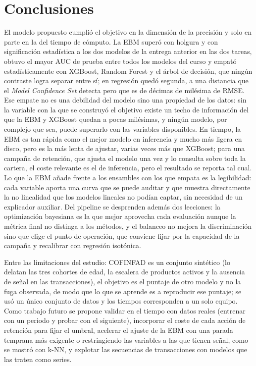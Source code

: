 \documentclass[pdflatex,sn-mathphys-num]{sn-jnl}
\begin{document}
\section{Conclusiones}\label{sec:conclusiones}

El modelo propuesto cumplió el objetivo en la dimensión de la precisión y solo en parte en la del tiempo de cómputo. La EBM superó con holgura y con significación estadística a los dos modelos de la entrega anterior en las dos tareas, obtuvo el mayor AUC de prueba entre todos los modelos del curso y empató estadísticamente con XGBoost, Random Forest y el árbol de decisión, que ningún contraste logra separar entre sí; en regresión quedó segunda, a una distancia que el \textit{Model Confidence Set} detecta pero que es de décimas de milésima de RMSE. Ese empate no es una debilidad del modelo sino una propiedad de los datos: sin la variable con la que se construyó el objetivo existe un techo de información del que la EBM y XGBoost quedan a pocas milésimas, y ningún modelo, por complejo que sea, puede superarlo con las variables disponibles. En tiempo, la EBM es tan rápida como el mejor modelo en inferencia y mucho más ligera en disco, pero es la más lenta de ajustar, varias veces más que XGBoost; para una campaña de retención, que ajusta el modelo una vez y lo consulta sobre toda la cartera, el coste relevante es el de inferencia, pero el resultado se reporta tal cual. Lo que la EBM añade frente a los ensambles con los que empata es la legibilidad: cada variable aporta una curva que se puede auditar y que muestra directamente la no linealidad que los modelos lineales no podían captar, sin necesidad de un explicador auxiliar. Del pipeline se desprenden además dos lecciones: la optimización bayesiana es la que mejor aprovecha cada evaluación aunque la métrica final no distinga a los métodos, y el balanceo no mejora la discriminación sino que elige el punto de operación, que conviene fijar por la capacidad de la campaña y recalibrar con regresión isotónica.

Entre las limitaciones del estudio: COFINFAD es un conjunto sintético (lo delatan las tres cohortes de edad, la escalera de productos activos y la ausencia de señal en las transacciones), el objetivo es el puntaje de otro modelo y no la fuga observada, de modo que lo que se aprende es a reproducir ese puntaje; se usó un único conjunto de datos y los tiempos corresponden a un solo equipo. Como trabajo futuro se propone validar en el tiempo con datos reales (entrenar con un periodo y probar con el siguiente), incorporar el coste de cada acción de retención para fijar el umbral, acelerar el ajuste de la EBM con una parada temprana más exigente o restringiendo las variables a las que tienen señal, como se mostró con k-NN, y explotar las secuencias de transacciones con modelos que las traten como series.
\end{document}
